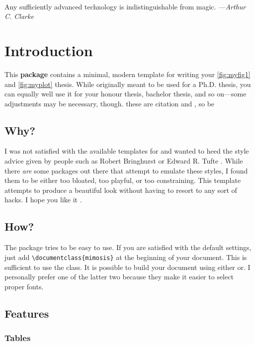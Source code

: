 \documentclass{mimosis}
\numberwithin{equation}{chapter}
\numberwithin{listing}{chapter}
\begin{document}
\hspace{0pt}\\ 
\begin{flushright}
Any sufficiently advanced technology is indistinguishable from magic.
\emph{---Arthur C. Clarke}
\end{flushright}
\clearpage

\tableofcontents
\mainmatter


\chapter{Introduction}
\label{sec:orgee3e526}
This \textbf{package} contains a minimal, modern template for writing your \autoref{fig:myfig1} and \autoref{fig:myplot}
thesis. While originally meant to be used for a Ph.D. thesis, you can
equally well use it for your honour thesis, bachelor thesis, and so
on---some adjustments may be necessary, though.
these are citation \cite{Laramee11,Laramee10} and \cite{Edelsbrunner02}, \cite{Edelsbrunner10}
so be \autocite{Tufte01}
\section{Why?}
\label{sec:org24ab08f}
I was not satisfied with the available templates for and wanted
to heed the style advice given by people such as Robert Bringhurst \cite{Bringhurst12} or Edward R.
Tufte \cite{Tufte90,Tufte01} . While there \emph{are} some packages out 
there that attempt to emulate these styles, I found them to be either
too bloated, too playful, or too constraining. This template attempts to
produce a beautiful look without having to resort to any sort of hacks.
I hope you like it \cite{nikouei19:_i_safe}.

\section{How?}
\label{sec:org38c22ca}
The package tries to be easy to use. If you are satisfied with the
default settings, just add \texttt{\textbackslash{}documentclass\{mimosis\}} at the beginning of your document.
This is sufficient to use the class.
It is possible to build your document using either  or. I personally prefer one of the latter two because they make
it easier to select proper fonts.
\section{Features}
\label{sec:orgb9a1e1a}
\subsection{Tables}
\label{sec:org3c96b40}
\end{document}
